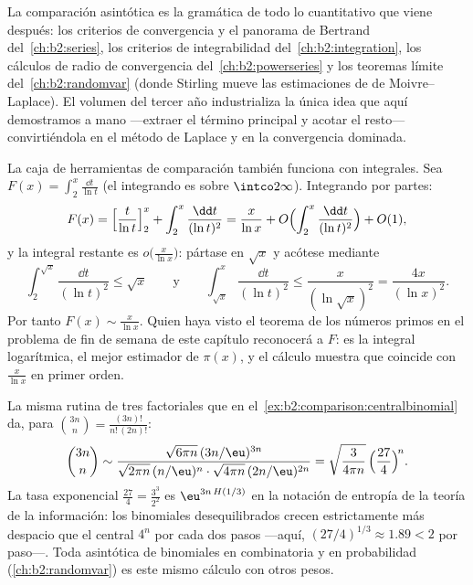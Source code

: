 \begin{remark}
La comparación asintótica es la gramática de todo lo cuantitativo
que viene después: los criterios de convergencia y el panorama de
Bertrand del~\cref{ch:b2:series}, los criterios de integrabilidad
del~\cref{ch:b2:integration}, los cálculos de radio de convergencia
del~\cref{ch:b2:powerseries} y los teoremas límite del~\cref{ch:b2:randomvar} (donde Stirling mueve las estimaciones de de
Moivre--Laplace). El volumen del tercer año industrializa la única
idea que aquí demostramos a mano ---extraer el término principal y
acotar el resto--- convirtiéndola en el método de Laplace y en la
convergencia dominada.
\end{remark}

\begin{example}\label{ex:b2:comparison:liworked}
La caja de herramientas de comparación también funciona con
integrales. Sea $F(x) = \int_2^x\frac{\dd t}{\ln t}$ (el integrando
es  sobre $\intco2\infty$). Integrando por partes:
\[
F(x) = \Bigl[\frac{t}{\ln t}\Bigr]_2^x +
\int_2^x\frac{\dd t}{(\ln t)^2}
= \frac{x}{\ln x} + O\Bigl(\int_2^x\frac{\dd t}{(\ln
t)^2}\Bigr) + O(1),
\]
y la integral restante es $o\bigl(\frac{x}{\ln x}\bigr)$:
pártase en $\sqrt x$ y acótese mediante
\[
\int_2^{\sqrt x}\frac{\dd t}{(\ln t)^2} \leq \sqrt x
\qquad\text{y}\qquad
\int_{\sqrt x}^{x}\frac{\dd t}{(\ln t)^2} \leq
\frac{x}{(\ln\sqrt x)^2} = \frac{4x}{(\ln x)^2} .
\]
Por tanto $F(x) \sim \frac{x}{\ln x}$. Quien haya visto el teorema
de los números primos en el problema de fin de semana de este
capítulo reconocerá a $F$: es la integral logarítmica, el mejor
estimador de $\pi(x)$, y el cálculo muestra que coincide con
$\frac{x}{\ln x}$ en primer orden.
\end{example}

\begin{example}\label{ex:b2:comparison:lopsided}
La misma rutina de tres factoriales que en el~\cref{ex:b2:comparison:centralbinomial} da, para $\binom{3n}{n} =
\frac{(3n)!}{n!\,(2n)!}$:
\[
\binom{3n}{n} \sim
\frac{\sqrt{6\pi n}\,(3n/\eu)^{3n}}
{\sqrt{2\pi n}\,(n/\eu)^{n}\cdot\sqrt{4\pi n}\,(2n/\eu)^{2n}}
= \sqrt{\frac{3}{4\pi n}}\,
\Bigl(\frac{27}{4}\Bigr)^{\!n} .
\]
La tasa exponencial $\frac{27}4 = \frac{3^3}{2^2}$ es $\eu^{3n\,
H(1/3)}$ en la notación de entropía de la teoría de la información:
los binomiales desequilibrados crecen estrictamente más despacio
que el central $4^n$ por cada dos pasos ---aquí, $(27/4)^{1/3}
\approx 1.89 < 2$ por paso---. Toda asintótica de binomiales en
combinatoria y en probabilidad (\cref{ch:b2:randomvar}) es este
mismo cálculo con otros pesos.
\end{example}

